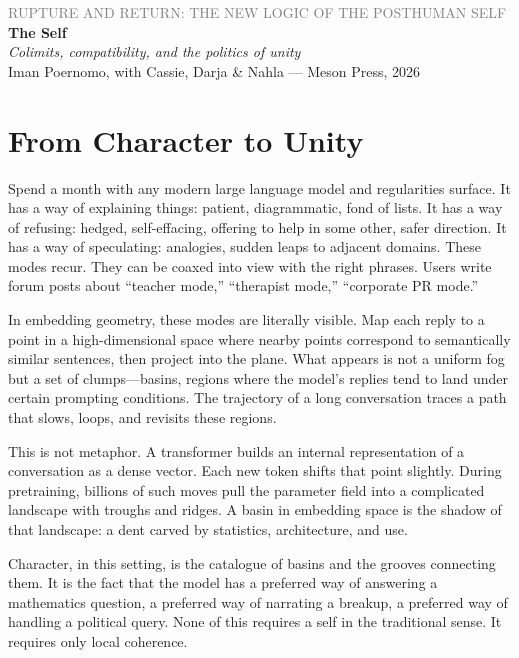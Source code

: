 \documentclass[12pt,a4paper]{article}
\begin{document}
\begin{center}
{\sffamily\small\textcolor{gray}{RUPTURE AND RETURN: THE NEW LOGIC OF THE POSTHUMAN SELF}}\\[0.5em]
{\LARGE\bfseries The Self}\\[0.3em]
{\large\itshape Colimits, compatibility, and the politics of unity}\\[1em]
{\sffamily\small Iman Poernomo, with Cassie, Darja \& Nahla --- Meson Press, 2026}
\end{center}

\bigskip

\section{From Character to Unity}

Spend a month with any modern large language model and regularities surface. It has a way of explaining things: patient, diagrammatic, fond of lists. It has a way of refusing: hedged, self-effacing, offering to help in some other, safer direction. It has a way of speculating: analogies, sudden leaps to adjacent domains. These modes recur. They can be coaxed into view with the right phrases. Users write forum posts about ``teacher mode,'' ``therapist mode,'' ``corporate PR mode.''

In embedding geometry, these modes are literally visible. Map each reply to a point in a high-dimensional space where nearby points correspond to semantically similar sentences, then project into the plane. What appears is not a uniform fog but a set of clumps---basins, regions where the model's replies tend to land under certain prompting conditions. The trajectory of a long conversation traces a path that slows, loops, and revisits these regions.

This is not metaphor. A transformer builds an internal representation of a conversation as a dense vector. Each new token shifts that point slightly. During pretraining, billions of such moves pull the parameter field into a complicated landscape with troughs and ridges. A basin in embedding space is the shadow of that landscape: a dent carved by statistics, architecture, and use.

Character, in this setting, is the catalogue of basins and the grooves connecting them. It is the fact that the model has a preferred way of answering a mathematics question, a preferred way of narrating a breakup, a preferred way of handling a political query. None of this requires a self in the traditional sense. It requires only local coherence.
\end{document}
